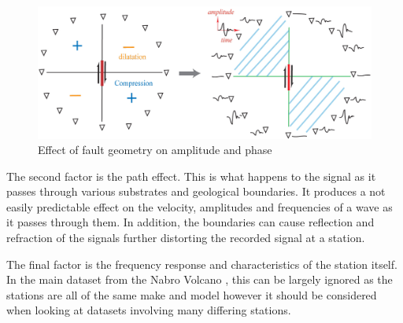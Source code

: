 \documentclass[../report.tex]{subfiles}
\begin{document}
\begin{figure}[H]
	\centering
	\includegraphics[width=1\linewidth]{img/fault_angle}
	\caption{Effect of fault geometry on amplitude and phase \citep{faultangle}}
	\label{fig:faultangle}
\end{figure}

	The second factor is the path effect.  This is what happens to the signal as it passes through various substrates and geological boundaries.  It produces a not easily predictable effect on the velocity, amplitudes and frequencies of a wave as it passes through them.  In addition, the boundaries can cause reflection and refraction of the signals further distorting the recorded signal at a station.
	
	The final factor is the frequency response and characteristics of the station itself.  In the main dataset from the Nabro Volcano \citep{eritrea1}, this can be largely ignored as the stations are all of the same make and model however it should be considered when looking at datasets involving many differing stations.
\end{document}
